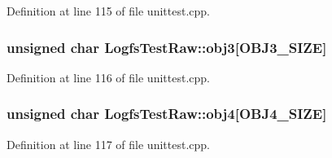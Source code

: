 \-Definition at line 115 of file unittest.\-cpp.

\hypertarget{group___unit_tests_gae2971f4ef641d737044260c4f11c1ba0}{
\subsubsection[{obj3}]{\setlength{\rightskip}{0pt plus 5cm}unsigned char {\bf \-Logfs\-Test\-Raw\-::obj3}\mbox{[}\-O\-B\-J3\-\_\-\-S\-I\-Z\-E\mbox{]}}}\label{group___unit_tests_gae2971f4ef641d737044260c4f11c1ba0}


\-Definition at line 116 of file unittest.\-cpp.

\hypertarget{group___unit_tests_ga538292c7d3fd8ffe5a32cc8b7e43d51c}{
\subsubsection[{obj4}]{\setlength{\rightskip}{0pt plus 5cm}unsigned char {\bf \-Logfs\-Test\-Raw\-::obj4}\mbox{[}\-O\-B\-J4\-\_\-\-S\-I\-Z\-E\mbox{]}}}\label{group___unit_tests_ga538292c7d3fd8ffe5a32cc8b7e43d51c}


\-Definition at line 117 of file unittest.\-cpp.

